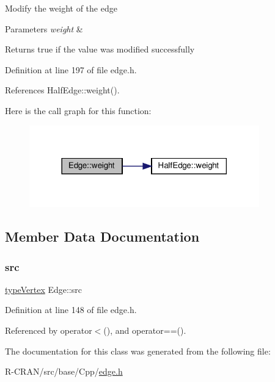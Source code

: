 Modify the weight of the edge 
\begin{DoxyParams}{Parameters}
{\em weight} & \\
\hline
\end{DoxyParams}
\begin{DoxyReturn}{Returns}
true if the value was modified successfully 
\end{DoxyReturn}


Definition at line 197 of file edge.\+h.



References Half\+Edge\+::weight().

Here is the call graph for this function\+:\nopagebreak
\begin{figure}[H]
\begin{center}
\leavevmode
\includegraphics[width=282pt]{classEdge_abaf02f474e1cdc61f3baf06875b4f38c_cgraph}
\end{center}
\end{figure}


\subsection{Member Data Documentation}
\mbox{\label{classEdge_ac5a2d838052e08bc14c4741465f690e6}} 
\subsubsection{\texorpdfstring{src}{src}}
{\footnotesize\ttfamily \hyperlink{edge_8h_a5fbd20c46956d479cb10afc9855223f6}{type\+Vertex} Edge\+::src\hspace{0.3cm}{\ttfamily [private]}}



Definition at line 148 of file edge.\+h.



Referenced by operator$<$(), and operator==().



The documentation for this class was generated from the following file\+:\begin{DoxyCompactItemize}
\item 
R-\/\+C\+R\+A\+N/src/base/\+Cpp/\hyperlink{edge_8h}{edge.\+h}\end{DoxyCompactItemize}
